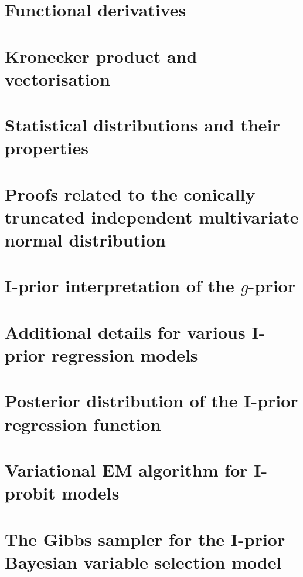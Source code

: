 \documentclass[a4paper,showframe,11pt]{report}
\begin{document}

\appendix

\chapter{Functional derivatives}


\chapter{Kronecker product and vectorisation}


\chapter{Statistical distributions and their properties}


\chapter{Proofs related to the conically truncated independent multivariate normal distribution}\label{apx:contrunproof}


\chapter{I-prior interpretation of the $g$-prior}\label{misc:gprior}


\chapter{Additional details for various I-prior regression models}


\chapter{Posterior distribution of the I-prior regression function}


\chapter{Variational EM algorithm for I-probit models}


\chapter{The Gibbs sampler for the I-prior Bayesian variable selection model}\label{apx:gibbsbvs}

 
\hClosingStuffStandalone
\end{document}
